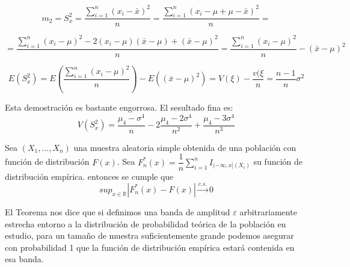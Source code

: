 

\begin{equation*}
m_2=S_x^2=\dfrac{\sum_{i=1}^n\left(x_i-\bar{x}\right)^2}{n}=\dfrac{\sum_{i=1}^n\left(x_i-\mu+\mu-\bar{x}\right)^2}{n}=
\end{equation*}

\begin{equation*}
=\dfrac{\sum_{i=1}^n\left(x_i-\mu\right)^2-2\left(x_i-\mu\right)\left(\bar{x}-\mu\right)+\left(\bar{x}-\mu\right)^2}{n}=\dfrac{\sum_{i=1}^n\left(x_i-\mu\right)^2}{n}-\left(\bar{x}-\mu\right)^2
\end{equation*}

\begin{equation*}
E\left(S_x^2\right)=E\left(\dfrac{\sum_{i=1}^n\left(x_i-\mu\right)^2}{n}\right)-E\left(\left(\bar{x}-\mu\right)^2\right)=V(\xi)-\dfrac{v(\xi}{n}=\dfrac{n-1}{n}\sigma^2
\end{equation*}


Esta demostraci\'on es bastante engorrosa. El sesultado fina es:
\begin{equation*}
V\left(S_x^2\right)=\dfrac{\mu_4-\sigma^4}{n}-2\dfrac{\mu_4-2\sigma^4}{n^2}+\dfrac{\mu_4-3\sigma^4}{n^3}
\end{equation*}


\begin{teorema}
Sea $(X_1,\ldots,X_n)$ una muestra aleatoria simple obtenida de una poblaci\'on con funci\'on de distribuci\'on $F(x)$. Sea $F_n^*(x)=\dfrac{1}{n}\sum_{i=1}^nI_{(-\infty,x](X_i)}$ su funci\'on de distribuci\'on emp\'irica. entonces se cumple que 
\begin{equation*}
sup_{x\in\mathbb{R}}\left|F_n^*(x)-F(x)\right|\overset{c.s.}{\to}0
\end{equation*}

\end{teorema}

El Teorema nos dice que si definimos una banda de amplitud $\varepsilon$ arbitrariamente estrecha entorno a la distribuci\'on de probabilidad te\'orica de la poblaci\'on en estudio, para un tama\~no de muestra suficientemente grande podemos asegurar con probabilidad 1 que la funci\'on de distribuci\'on emp\'irica estar\'a contenida en esa banda.